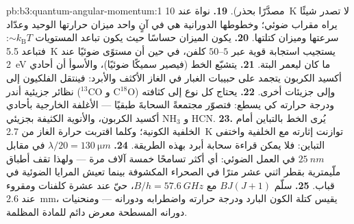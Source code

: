 \begin{solution}{pb:b3:quantum-angular-momentum:1}
مصدَّرًا بحذر).
\textbf{19.} نواة عند \qty{10}{K} لا تصدر شيئًا يراه مقراب
ضوئي؛ وخطوطها الدورانية هي في آنٍ واحد ميزان حرارتها
الوحيد وعدّاد سرعتها وميزان كتلتها.
\textbf{20.} يكون الميزان حساسًا حيث يكون تباعد المستويات $\sim
k_{\text{B}}T$: فتباعد \qty{5.5}{K} يستجيب استجابة قوية عبر
$5$--$50$ كلفن، في حين أن مستوًى ضوئيًا عند \qty{2}{eV} ما كان
ليعمر البتة.
\textbf{21.} يتشبّع الخط (فيصير سميكًا ضوئيًا)، والأسوأ أن أحادي أكسيد
الكربون يتجمد على حبيبات الغبار في الغاز الأكثف والأبرد:
فينتقل الفلكيون إلى نظائر جزيئية أندر ($^{13}$CO و C$^{18}$O)
وإلى جزيئات أخرى.
\textbf{22.} يحتاج كل نوع إلى كثافته ودرجة حرارته كي
يسطع: فتصوّر مجتمعةً السحابةَ طبقيًا --- الأغلفة الخارجية بأحادي
أكسيد الكربون، والأنوية الكثيفة بجزيئي NH$_3$ و HCN.
\textbf{23.} يُرى الخط بالتباين أمام الخلفية
الكونية؛ وكلما اقتربت حرارة الغاز من \qty{2.7}{K} توازنت
إثارته مع الخلفية واختفى التباين: فلا يمكن قراءة سحابة
أبرد بهذه الطريقة.
\textbf{24.} $\lambda/20 = \qty{130}{\micro m}$ في مقابل
$\qty{25}{nm}$ في العمل الضوئي: أي أكثر تسامحًا خمسة آلاف
مرة --- ولهذا تقف أطباق ملّيمترية بقطر اثني عشر مترًا في
الصحراء المكشوفة بينما تعيش المرايا الضوئية في قباب.
\textbf{25.} سلّم $BJ(J+1)$ مع $B/h = \qty{57.6}{GHz}$، حيّ
عند عشرة كلفنات ومقروء عند \qty{2.6}{mm}، يقيس كتلة الكون
البارد ودرجة حرارته واضطرابه ودورانه --- ومنحنيات
دورانه المسطحة معرض دائم للمادة المظلمة.
\end{solution}

